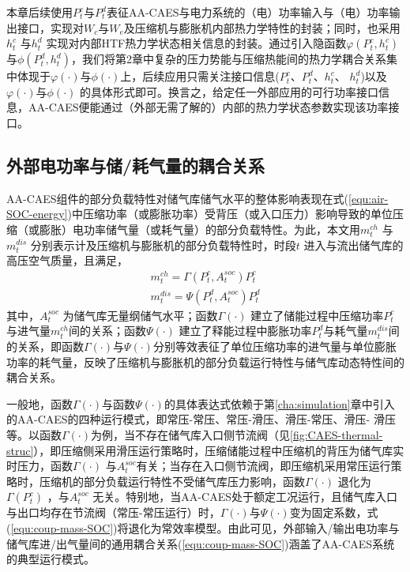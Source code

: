 本章后续使用$P_t^c$与$P_t^d$表征AA-CAES与电力系统的（电）功率输入与（电）功率输出接口，实现对$W_c$与$W_e$及压缩机与膨胀机内部热力学特性的封装；同时，也采用$h_t^c$ 与$h_t^d$ 实现对内部HTF热力学状态相关信息的封装。通过引入隐函数$\varphi ({P_t^c,h_t^c})$与$\phi ({P_t^d,h_t^d})$，我们将第2章中复杂的压力势能与压缩热能间的热力学耦合关系集中体现于$\varphi(\cdot) $与$\phi(\cdot)$上，后续应用只需关注接口信息($ P_t^c$、$P_t^d$、$h_t^c$、 $h_t^d$)以及$\varphi(\cdot)$与$\phi(\cdot)$ 的具体形式即可。换言之，给定任一外部应用的可行功率接口信息，AA-CAES便能通过（外部无需了解的）内部的热力学状态参数实现该功率接口。

\subsection{外部电功率与储/耗气量的耦合关系}
AA-CAES组件的部分负载特性对储气库储气水平的整体影响表现在式(\ref{equ:air-SOC-energy})中压缩功率（或膨胀功率）受背压（或入口压力）影响导致的单位压缩（或膨胀）电功率储气量（或耗气量）的部分负载特性。为此，本文用$m_t^{ch}$ 与$m_t^{dis}$ 分别表示计及压缩机与膨胀机的部分负载特性时，时段$t$ 进入与流出储气库的高压空气质量，且满足，
\begin{subequations}
\label{equ:coup-mass-SOC}
\begin{gather}
m_t^{ch} = \Gamma({P_t^c,A_t^{soc}})P_t^c\label{equ:coup-mass-SOC-char}\\
m_t^{dis} = \Psi({P_t^d,A_t^{soc}})P_t^d \label{equ:coup-mass-SOC-disc}
\end{gather}
\end{subequations}
其中，$A_t^{soc}$ 为储气库无量纲储气水平；函数$\Gamma(\cdot)$ 建立了储能过程中压缩功率$P_t^c$ 与进气量$m_t^{ch}$间的关系；函数$\Psi(\cdot)$ 建立了释能过程中膨胀功率$P_t^d$与耗气量$m_t^{dis}$间的关系，即函数$\Gamma (\cdot)$与$\Psi(\cdot)$分别等效表征了单位压缩功率的进气量与单位膨胀功率的耗气量，反映了压缩机与膨胀机的部分负载运行特性与储气库动态特性间的耦合关系。

一般地，函数$\Gamma(\cdot)$与函数$\Psi(\cdot)$的具体表达式依赖于第\ref{cha:simulation}章中引入的AA-CAES的四种运行模式，即常压-常压、常压-滑压、滑压-常压、滑压- 滑压等。以函数$\Gamma(\cdot)$为例，当不存在储气库入口侧节流阀（见\ref{fig:CAES-thermal-struc}），即压缩侧采用滑压运行策略时，压缩储能过程中压缩机的背压为储气库实时压力，函数$\Gamma(\cdot)$ 与$A_t^{soc}$有关；当存在入口侧节流阀，即压缩机采用常压运行策略时，压缩机的部分负载运行特性不受储气库压力影响，函数$\Gamma(\cdot)$ 退化为$\Gamma (P_t^c)$ ，与$A_t^{soc}$ 无关。特别地，当AA-CAES处于额定工况运行，且储气库入口与出口均存在节流阀（常压-常压运行）时，$\Gamma(\cdot)$与$\Psi(\cdot)$变为固定系数，式(\ref{equ:coup-mass-SOC})将退化为常效率模型。由此可见，外部输入/输出电功率与储气库进/出气量间的通用耦合关系(\ref{equ:coup-mass-SOC})涵盖了AA-CAES系统的典型运行模式。

